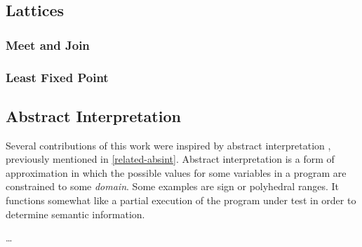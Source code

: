 \subsection{Lattices}\label{lattice-background}

\subsubsection{Meet and Join}

\subsubsection{Least Fixed Point}

\subsection{Abstract Interpretation}\label{background-absint}
Several contributions of this work were inspired by
abstract interpretation \autocite{cousot1976static,cousot1977abstract}
,
previously mentioned in \cref{related-absint}.
Abstract interpretation is a form of approximation
in which the possible values for some variables in a program
are constrained to some \emph{domain}.
Some examples are sign or polyhedral ranges.
It functions somewhat like a partial execution of the program under test
in order to determine semantic information.

\todo\dots

